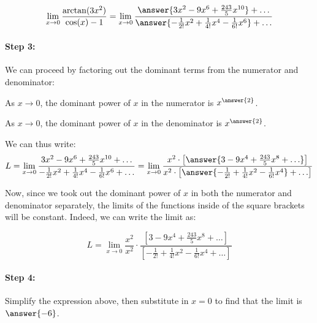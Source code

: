 \documentclass{ximera}
\begin{document}
\begin{exercise}
\begin{hint}
\begin{question}
\[
\lim_{x \to 0} \frac{\arctan(3x^2)}{\cos(x)-1} = \lim_{x \to 0} \frac{\answer{3x^2-9x^6+\frac{243}{5}x^{10}}+\ldots}{ \answer{-\frac{1}{2!}x^2+\frac{1}{4!}x^4-\frac{1}{6!}x^6} +\ldots}
\]

\paragraph{Step 3:} We can proceed by factoring out the dominant terms from the numerator and denominator:

As $x \to 0$, the dominant power of $x$ in the numerator is $x^{\answer{2}}$.

As $x \to 0$, the dominant power of $x$ in the denominator is $x^{\answer{2}}$.

\begin{question}
We can thus write:
\[
L = \lim_{x \to 0} \frac{3x^2-9x^6+\frac{243}{5}x^{10}+\ldots}{-\frac{1}{2!}x^2+\frac{1}{4!}x^4-\frac{1}{6!}x^6 +\ldots}  = \lim_{x \to 0} \frac{ x^2 \cdot \left[\answer{3-9x^4+\frac{243}{5}x^8+\ldots} \right]}{x^2 \cdot \left[\answer{-\frac{1}{2!}+\frac{1}{4!}x^2-\frac{1}{6!}x^4} +\ldots\right]}
\]

\begin{question}
 Now, since we took out the dominant power of $x$ in both the numerator and denominator separately, the limits of the functions inside of the square brackets will be constant.  Indeed, we can write the limit as:

\[
L = \lim_{x \to 0} \frac{x^2}{x^2} \cdot \frac{\left[3-9x^4+\frac{243}{5}x^8+\ldots\right]}{\left[-\frac{1}{2!}+\frac{1}{4!}x^2-\frac{1}{6!}x^4 +\ldots \right]}
\]

\paragraph{Step 4:} Simplify the expression above, then substitute in $x=0$ to find that the limit is $\answer{-6}$.


\end{question}
\end{question}
\end{question}
\end{hint}
\end{exercise}
\end{document}
